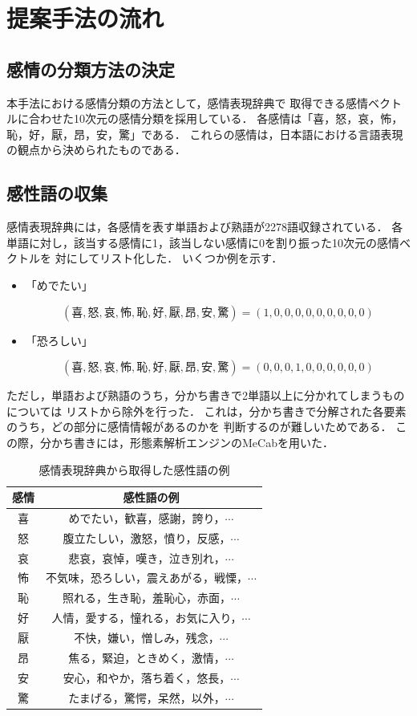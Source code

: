 	\section{提案手法の流れ}

		\subsection{感情の分類方法の決定}
			本手法における感情分類の方法として，感情表現辞典\cite{kanjou_hyogen_jiten}で
			取得できる感情ベクトルに合わせた10次元の感情分類を採用している．
			各感情は「喜，怒，哀，怖，恥，好，厭，昂，安，驚」である．
			これらの感情は，日本語における言語表現の観点から決められたものである．

		\subsection{感性語の収集}
			感情表現辞典には，各感情を表す単語および熟語が2278語収録されている．
			各単語に対し，該当する感情に1，該当しない感情に0を割り振った10次元の感情ベクトルを
			対にしてリスト化した．
			いくつか例を示す．
			\begin{itemize}
				\item 「めでたい」
				\par $$(喜, 怒, 哀, 怖, 恥, 好, 厭, 昂, 安, 驚)=(1, 0, 0, 0, 0, 0, 0, 0, 0, 0)$$
				\item 「恐ろしい」
				\par $$(喜, 怒, 哀, 怖, 恥, 好, 厭, 昂, 安, 驚)=(0, 0, 0, 1, 0, 0, 0, 0, 0, 0)$$
			\end{itemize}
			ただし，単語および熟語のうち，分かち書きで2単語以上に分かれてしまうものについては
			リストから除外を行った．
			これは，分かち書きで分解された各要素のうち，どの部分に感情情報があるのかを
			判断するのが難しいためである．
			この際，分かち書きには，形態素解析エンジンのMeCab\cite{mecab}を用いた．
			\begin{table}[H]
				\caption{感情表現辞典から取得した感性語の例}
				\label{table:kansei_words}
				\centering
					\begin{tabular}{cc}
						\hline
						感情 & 感性語の例 \\
						\hline \hline
						喜 & めでたい，歓喜，感謝，誇り，$\cdots$ \\
						怒 & 腹立たしい，激怒，憤り，反感，$\cdots$ \\
						哀 & 悲哀，哀悼，嘆き，泣き別れ，$\cdots$ \\
						怖 & 不気味，恐ろしい，震えあがる，戦慄，$\cdots$ \\
						恥 & 照れる，生き恥，羞恥心，赤面，$\cdots$ \\
						好 & 人情，愛する，憧れる，お気に入り，$\cdots$ \\
						厭 & 不快，嫌い，憎しみ，残念，$\cdots$ \\
						昂 & 焦る，緊迫，ときめく，激情，$\cdots$ \\
						安 & 安心，和やか，落ち着く，悠長，$\cdots$ \\
						驚 & たまげる，驚愕，呆然，以外，$\cdots$ \\
						\hline
					\end{tabular}
				\end{table}

